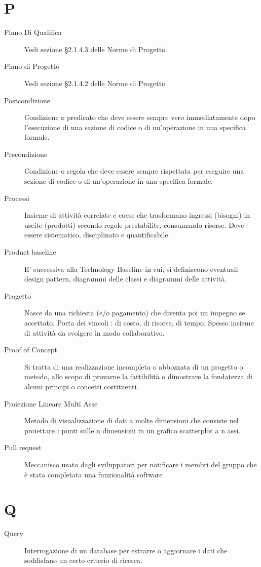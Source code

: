 \documentclass{article}
\begin{document}
\section{P}
\begin{description}
  \item[Piano Di Qualifica] Vedi sezione \S2.1.4.3 delle Norme di Progetto 
  \item[Piano di Progetto] Vedi sezione \S2.1.4.2 delle Norme di Progetto
  \item[Postcondizione] Condizione o predicato che deve essere sempre vero immediatamente dopo l’esecuzione di una sezione di codice o di un’operazione in una specifica formale.
  \item[Precondizione] Condizione o regola che deve essere sempre rispettata per eseguire una sezione di codice o di un’operazione in una specifica formale.
  \item[Processi] Insieme di attività correlate e coese che trasformano ingressi (bisogni) in uscite (prodotti) secondo regole prestabilite, consumando risorse. Deve essere sistematico, disciplinato e quantificabile.
  \item[Product baseline] E' successiva alla Technology Baseline in cui, si definiscono eventuali design pattern, diagrammi delle classi e diagrammi delle attività.
  \item[Progetto] Nasce da una richiesta (e/o pagamento) che diventa poi un impegno se accettato. Porta dei vincoli : di costo, di risorse, di tempo. Spesso insieme di attività da svolgere in modo collaborativo.
  \item[Proof of Concept] Si tratta di una realizzazione incompleta o abbozzata di un progetto o metodo, allo scopo di provarne la fattibilità o dimostrare la fondatezza di alcuni principi o concetti costituenti.
  \item[Proiezione Lineare Multi Asse] Metodo di visualizzazione di dati a molte dimensioni che consiste nel proiettare i punti sulle n dimensioni in un grafico scatterplot a n assi. 
  \item[Pull request] Meccanisco usato dagli sviluppatori per notificare i membri del gruppo che è stata completata una funzionalità software
\end{description}
\newpage
\section{Q}
\begin{description}
  \item[Query] Interrogazione di un database per estrarre o aggiornare i dati che soddisfano un certo criterio di ricerca.
\end{description}
\newpage
\end{document}
